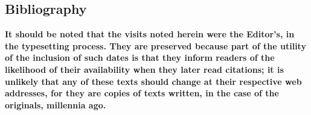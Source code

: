 \begin{refsection}

\clearpage

\nocite{CiceroOratore1942}
\nocite{contrasophists}
\nocite{IsocratesDiscourses15Antidosis1929}
\nocite{PlatoGorgias1925}
\nocite{BenoitIsocratesAristotleRhetoric1990}
\nocite{BenoitIsocratesPlatoRhetoric1991}
\nocite{PlatoPhaedrus1914}
\nocite{GrotePlatoothercompanions1867}
\nocite{DionysiusofHalicarnassusAncientOratorsIsocrates1974}
\nocite{QuintilianOratorEducation2002}

\section{Bibliography}

\begin{multicols}{2}

\textbf{It should be noted that the visits noted herein were the Editor's, in the typesetting process. They are preserved because part of the utility of the inclusion of such dates is that they inform readers of the likelihood of their availability when they later read citations; it is unlikely that any of these texts should change at their respective web addresses, for they are copies of texts written, in the case of the originals, millennia ago.}

\printbibliography[heading=none]

\end{multicols}

\end{refsection}